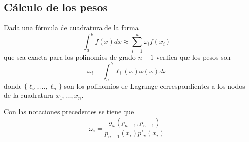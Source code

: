  \subsection{Cálculo de los pesos}
\begin{obs} Dada una fórmula de cuadratura de la forma
$$\int_a^bf(x)dx\approx\sum_{i=1}^n\omega_if(x_i)$$
que sea exacta para los polinomios de grado $n-1$ verifica que los pesos son
 $$\omega_i=\int_a^b\ell_i(x)\omega(x)dx$$
 donde $\{\ell_o,\ldots,\ell_n\}$ son los polinomios de Lagrange correspondientes a los nodos de la cuadratura $x_1,\ldots,x_n$. 
 \end{obs}
 \begin{prop}
Con las notaciones precedentes se tiene que
\begin{align}
  \omega_i=\dfrac{g_{\omega}(p_{n-1},p_{n-1})}{p_{n-1}(x_i)p'_n(x_i)}  
  \label{pesos:gauss}
\end{align}
 \end{prop}
